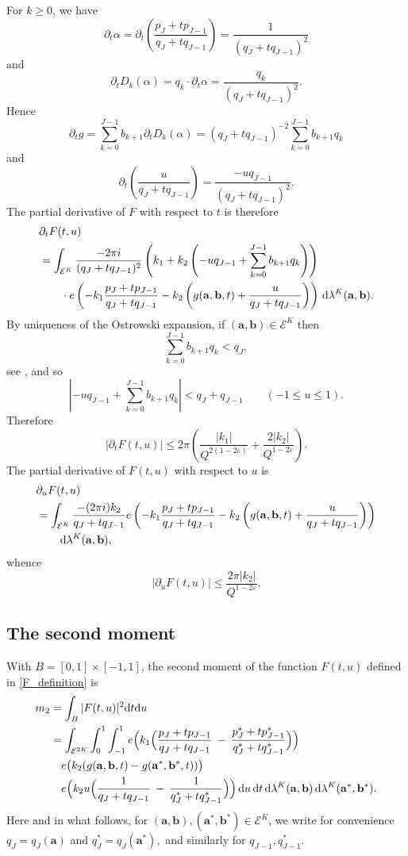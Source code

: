 \documentclass[12pt, reqno]{amsart}
\theoremstyle{definition}
\theoremstyle{remark}
\numberwithin{equation}{section}
\def\alp{{\alpha}} \def\bfalp{{\boldsymbol \alpha}}
\def\lam{{\lambda}} \def\Lam{{\Lambda}} \def\Lamtil{{\widetilde \Lambda}}
\def\le{\leqslant} \def\ge{\geqslant}
\def\d{{\,{\rm d}}}
\def \ba {\mathbf a}
\def \bb {\mathbf b}
\def \cE {\mathcal E}
\begin{document}
For $k \ge 0$, we have 
\[
\partial_t\alpha = \partial_t \left( \frac{p_J + t p_{J-1}}{q_J + tq_{J-1}} \right) = \frac{1}{(q_J+tq_{J-1})^2}
\]
and
\[
\partial_t D_k(\alp) = q_k\cdot \partial_t \alp = \frac{q_k}{(q_J+tq_{J-1})^2}.
\]
Hence
\begin{equation} \label{gt}
\partial_t g = \sum_{k=0}^{J-1}b_{k+1}\partial_t D_k(\alp) = (q_J+tq_{J-1})^{-2}\sum_{k=0}^{J-1}b_{k+1}q_k   
\end{equation}
and
\[ 
\partial_t \left( \frac{u}{q_J + tq_{J-1}}\right) = \frac{-u q_{J-1}}{(q_J+tq_{J-1})^2 }.
\]
The partial derivative of $F$ with respect to $t$ is therefore
\begin{align*}
&\partial_t F(t,u) \\
&=  \int_{\cE^K} \frac{-2 \pi i}{(q_J+tq_{J-1})^2}\left(k_1 + k_2 \left(-uq_{J-1} + \sum_{k=0}^{J-1}b_{k+1}q_k \right) \right) \\
&  \qquad \cdot e \left( -k_1 \frac{p_J + t p_{J-1}}{q_J + tq_{J-1}} - k_2 \left(g(\ba,\bb,t) + \frac{u}{q_J + tq_{J-1}}\right) \right) \d \lam^K(\ba,\bb).
\end{align*}
By uniqueness of the Ostrowski expansion, if $(\ba,\bb) \in \cE^K$ then
\[
\sum_{k=0}^{J-1}b_{k+1}q_k <  q_J,
\]
see \cite[Chapter II, \S 4]{RS1992}, and so
\[ 
\left| -uq_{J-1} + 
\sum_{k=0}^{J-1}b_{k+1}q_k 
\right| 
< q_J + q_{J-1} \qquad (-1 \le u \le 1).
\]
Therefore
\[
|\partial_t F(t,u)| \le 2 \pi \left( \frac{|k_1|}{Q^{2(1-2\varepsilon)}} + \frac{2|k_2|}{Q^{1-2\varepsilon}} \right).
\]
The partial derivative of $F(t,u)$ with respect to $u$ is
\begin{align*}
&\partial_u F(t,u) \\
&=  \int_{\cE^K}\frac{-(2 \pi i) k_2}{q_J+tq_{J-1}} e\left( -k_1
\frac{p_J + t p_{J-1}}{q_J + tq_{J-1}} - k_2
\left(g(\ba,\bb,t) + \frac{u}{q_J + tq_{J-1}}\right) \right) \\
&\qquad \d \lam^K(\ba,\bb),
\end{align*}
whence
\[
|\partial_u F(t,u)| \le \frac{2\pi |k_2|}{ Q^{1-2\varepsilon}}.
\]

\subsection{The second moment}
\label{m2calc}

With $B = [0,1] \times [-1, 1]$, the second moment of the function $F(t,u)$ defined in \eqref{F_definition} is 
\begin{align*}
m_2 &= \int_B |F(t,u)|^2 \mathrm{d}t \mathrm{d}u \\ 
&= \int_{\cE^{2K}} \int_0^1 \int_{-1}^1 e\Big(k_1\Big( \frac{p_J+tp_{J-1}}{q_J+tq_{J-1}} \: - \: \frac{p_J^* +tp_{J-1}^*}{q_J^* +tq_{J-1}^*}\Big)\Big)  \\ &
\quad e\big(k_2(g(\ba,\bb,t) - g(\ba^*,\bb^*,t))\big) \\
& \quad e\Big(k_2u\Big( \frac{1}{q_J+tq_{J-1}} \: - \: \frac{1}{q_J^*+tq_{J-1}^*}\Big)\Big)
\d u \d t \d\lambda^K(\ba,\bb) \d\lambda^K(\ba^*, \bb^*).
\end{align*}
Here and in what follows, for $(\ba,\bb), (\ba^*,\bb^*) \in \cE^K$, we write for convenience  $q_J=q_J(\ba)$ and $q_J^*=q_J(\ba^*),$ and similarly for $q_{J-1}, q_{J-1}^*.$ 
\end{document}
